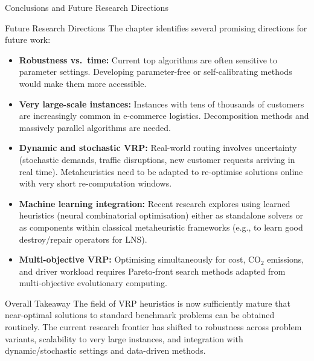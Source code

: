 \documentclass[aspectratio=169,10pt]{beamer}
\begin{document}
\begin{frame}[allowframebreaks]{Conclusions and Future Research Directions}
  \begin{block}{Future Research Directions}
    The chapter identifies several promising directions for future work:
    \begin{itemize}
      \item \textbf{Robustness vs.\ time:} Current top algorithms are
            often sensitive to parameter settings.  Developing
            parameter-free or self-calibrating methods would make
            them more accessible.
      \item \textbf{Very large-scale instances:} Instances with tens
            of thousands of customers are increasingly common in
            e-commerce logistics.  Decomposition methods and massively
            parallel algorithms are needed.
      \item \textbf{Dynamic and stochastic VRP:} Real-world routing
            involves uncertainty (stochastic demands, traffic
            disruptions, new customer requests arriving in real time).
            Metaheuristics need to be adapted to re-optimise solutions
            online with very short re-computation windows.
      \item \textbf{Machine learning integration:} Recent research
            explores using learned heuristics (neural combinatorial
            optimisation) either as standalone solvers or as
            components within classical metaheuristic frameworks
            (e.g., to learn good destroy/repair operators for LNS).
      \item \textbf{Multi-objective VRP:} Optimising simultaneously
            for cost, CO$_2$ emissions, and driver workload requires
            Pareto-front search methods adapted from multi-objective
            evolutionary computing.
    \end{itemize}
  \end{block}

  \begin{alertblock}{Overall Takeaway}
    The field of VRP heuristics is now sufficiently mature that near-optimal
    solutions to standard benchmark problems can be obtained routinely.
    The current research frontier has shifted to robustness across
    problem variants, scalability to very large instances, and
    integration with dynamic/stochastic settings and data-driven methods.
  \end{alertblock}

\end{frame}

\end{document}
